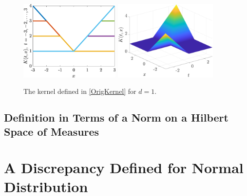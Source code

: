 \documentclass[graybox]{svmult}
\begin{document}
\begin{figure}
    \centering
    \includegraphics[height = 4cm]{KernelPict.eps} \qquad
    \includegraphics[height = 4cm]{Kernel3DPict.eps}
    \caption{The kernel defined in \eqref{OrigKernel} for $d=1$.}
    \label{fig:kernelpict}
\end{figure}

\subsection{Definition in Terms of a Norm on a Hilbert Space of Measures}



\section{A Discrepancy Defined for Normal Distribution}
\end{document}

